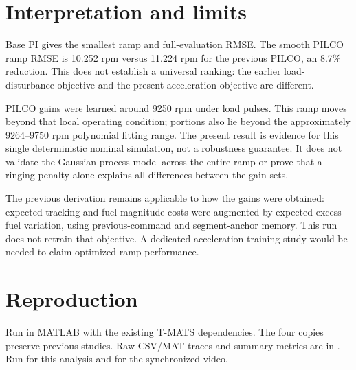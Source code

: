 \section{Interpretation and limits}
Base PI gives the smallest ramp and full-evaluation RMSE. The smooth PILCO ramp RMSE is 10.252 rpm versus 11.224 rpm for the previous PILCO, an 8.7\% reduction. This does not establish a universal ranking: the earlier load-disturbance objective and the present acceleration objective are different.

PILCO gains were learned around 9250 rpm under load pulses. This ramp moves beyond that local operating condition; portions also lie beyond the approximately 9264--9750 rpm polynomial fitting range. The present result is evidence for this single deterministic nominal simulation, not a robustness guarantee. It does not validate the Gaussian-process model across the entire ramp or prove that a ringing penalty alone explains all differences between the gain sets.

The previous derivation remains applicable to how the gains were obtained: expected tracking and fuel-magnitude costs were augmented by expected excess fuel variation, using previous-command and segment-anchor memory. This run does not retrain that objective. A dedicated acceleration-training study would be needed to claim optimized ramp performance.
\section{Reproduction}
Run  in MATLAB with the existing T-MATS dependencies. The four  copies preserve previous studies. Raw CSV/MAT traces and summary metrics are in . Run  for this analysis and  for the synchronized video.
